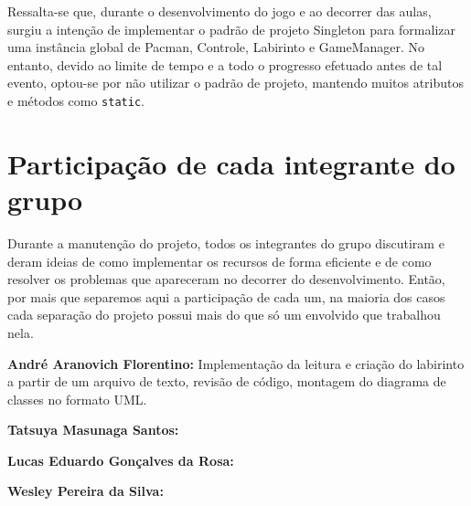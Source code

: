 \documentclass[]{article}
\begin{document}
Ressalta-se que, durante o desenvolvimento do jogo e ao decorrer das aulas, surgiu a intenção de implementar o padrão de projeto Singleton para formalizar uma instância global de Pacman, Controle, Labirinto e GameManager. No entanto, devido ao limite de tempo e a todo o progresso efetuado antes de tal evento, optou-se por não utilizar o padrão de projeto, mantendo muitos atributos e métodos como \texttt{static}.

\section{Participação de cada integrante do grupo}
Durante a manutenção do projeto, todos os integrantes do grupo discutiram e deram ideias de como implementar os recursos de forma eficiente e de como resolver os problemas que apareceram no decorrer do desenvolvimento. Então, por mais que separemos aqui a participação de cada um, na maioria dos casos cada separação do projeto possui mais do que só um envolvido que trabalhou nela.

\textbf{André Aranovich Florentino:} Implementação da leitura e criação do labirinto a partir de um arquivo de texto, revisão de código, montagem do diagrama de classes no formato UML.

\textbf{Tatsuya Masunaga Santos:}

\textbf{Lucas Eduardo Gonçalves da Rosa:}

\textbf{Wesley Pereira da Silva:}
\end{document}
